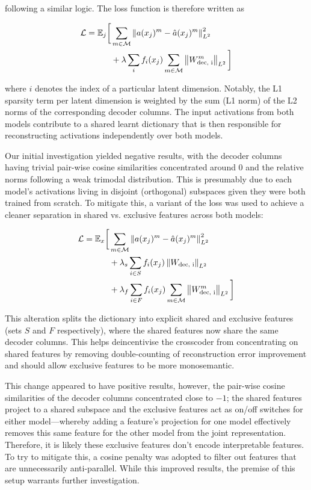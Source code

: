\documentclass[letterpaper]{article} %
\begin{document}
following a similar logic. The loss function is therefore written as

\begin{align}
\mathcal{L} = \mathbb{E}_j \bigg[
&\sum\limits_{m \in \mathcal{M}} \left\|a(x_j)^m - \hat{a}(x_j)^m \right\|^2_{L^2} \notag \\
&+ \lambda \sum\limits_i f_i(x_j) \sum\limits_{m \in \mathcal{M}} \left\|W^m_{\text{dec, i}}\right\|_{L^2}
\bigg]
\end{align}

where $i$ denotes the index of a particular latent dimension. Notably, the L1 sparsity term per latent dimension is weighted by the sum (L1 norm) of the L2 norms of the corresponding decoder columns. The input activations from both models contribute to a shared learnt dictionary that is then responsible for reconstructing activations independently over both models.

Our initial investigation yielded negative results, with the decoder columns having trivial pair-wise cosine similarities concentrated around 0 and the relative norms following a weak trimodal distribution. This is presumably due to each model's activations living in disjoint (orthogonal) subspaces given they were both trained from scratch. To mitigate this, a variant of the loss was used to achieve a cleaner separation in shared vs. exclusive features across both models:

\begin{align}
\mathcal{L} = \mathbb{E}_x \bigg[
&\sum\limits_{m \in \mathcal{M}} \left\|a(x_j)^m - \hat{a}(x_j)^m \right\|^2_{L^2} \notag \\
&+ \lambda_s \sum\limits_{i \in S} f_i(x_j) \left\|W_{\text{dec, i}}\right\|_{L^2} \notag \\
&+ \lambda_f \sum\limits_{i \in F} f_i(x_j) \sum\limits_{m \in \mathcal{M}} \left\|W^m_{\text{dec, i}}\right\|_{L^2}
\bigg]
\end{align}

This alteration splits the dictionary into explicit shared and exclusive features (sets $S$ and $F$ respectively), where the shared features now share the same decoder columns. This helps deincentivise the crosscoder from concentrating on shared features by removing double-counting of reconstruction error improvement and should allow exclusive features to be more monosemantic.

This change appeared to have positive results, however, the pair-wise cosine similarities of the decoder columns concentrated close to $-1$; the shared features project to a shared subspace and the exclusive features act as on/off switches for either model—whereby adding a feature's projection for one model effectively removes this same feature for the other model from the joint representation. Therefore, it is likely these exclusive features don't encode interpretable features. To try to mitigate this, a cosine penalty was adopted to filter out features that are unnecessarily anti-parallel. While this improved results, the premise of this setup warrants further investigation.
\end{document}
